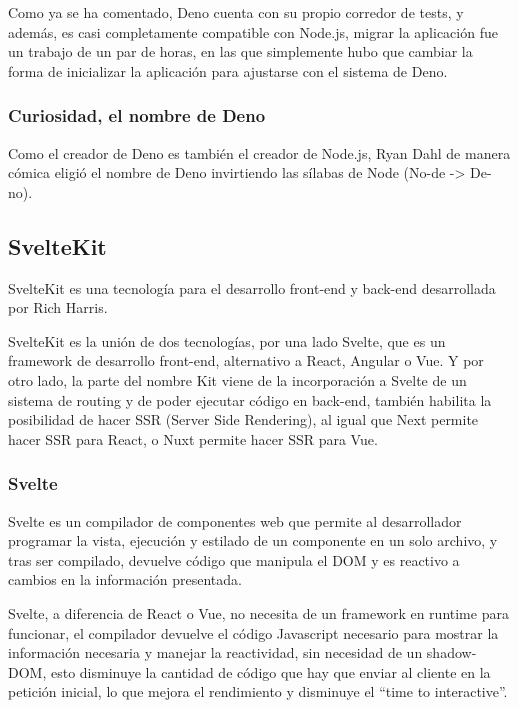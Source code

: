 Como ya se ha comentado, Deno cuenta con su propio corredor de tests, y además, es casi completamente compatible con Node.js, migrar la aplicación fue un trabajo de un par de horas, en las que simplemente hubo que cambiar la forma de inicializar la aplicación para ajustarse con el sistema de Deno.

\subsubsection{Curiosidad, el nombre de Deno}
Como el creador de Deno es también el creador de Node.js, Ryan Dahl de manera cómica eligió el nombre de Deno invirtiendo las sílabas de Node (No-de -> De-no).


\subsection{SvelteKit}
SvelteKit \cite{sveltekit_docs} es una tecnología para el desarrollo front-end y back-end desarrollada por Rich Harris.

SvelteKit es la unión de dos tecnologías, por una lado Svelte, que es un framework de desarrollo front-end, alternativo a React, Angular o Vue. Y por otro lado, la parte del nombre Kit viene de la incorporación a Svelte de un sistema de routing y de poder ejecutar código en back-end, también habilita la posibilidad de hacer SSR (Server Side Rendering), al igual que Next permite hacer SSR para React, o Nuxt permite hacer SSR para Vue.

\subsubsection{Svelte}
Svelte \cite{svelte_docs} es un compilador de componentes web que permite al desarrollador programar la vista, ejecución y estilado de un componente en un solo archivo, y tras ser compilado, devuelve código que manipula el DOM y es reactivo a cambios en la información presentada.

Svelte, a diferencia de React o Vue, no necesita de un framework en runtime para funcionar, el compilador devuelve el código Javascript necesario para mostrar la información necesaria y manejar la reactividad, sin necesidad de un shadow-DOM, esto disminuye la cantidad de código que hay que enviar al cliente en la petición inicial, lo que mejora el rendimiento y disminuye el “time to interactive”.

